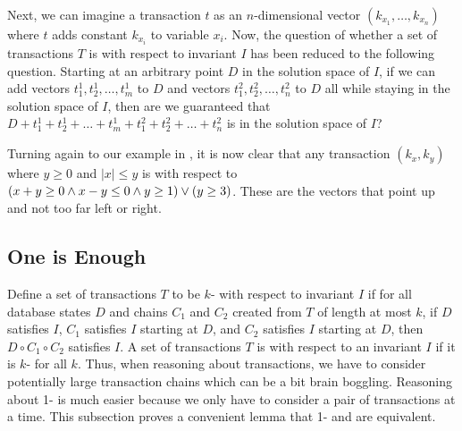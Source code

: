 Next, we can imagine a transaction $t$ as an $n$-dimensional vector $(k_{x_1},
\ldots, k_{x_n})$ where $t$ adds constant $k_{x_i}$ to variable $x_i$. Now, the
question of whether a set of transactions $T$ is \iconfluent{} with respect to
invariant $I$ has been reduced to the following question. Starting at an
arbitrary point $D$ in the solution space of $I$, if we can add vectors $t^1_1,
t^1_2, \ldots, t^1_m$ to $D$ and vectors $t^2_1, t^2_2, \ldots, t^2_n$ to $D$
all while staying in the solution space of $I$, then are we guaranteed that $D
+ t^1_1 + t^1_2 + \ldots + t^1_m + t^2_1 + t^2_2 + \ldots + t^2_n$ is in the
solution space of $I$?

Turning again to our example in , it is now clear
that any transaction $(k_x, k_y)$ where $y \geq 0$ and $|x| \leq y$ is
\iconfluent{} with respect to $(x + y \geq 0 \land x - y \leq 0 \land y \geq 1) \lor (y \geq 3)$. These are the vectors that point up and
not too far left or right.

\subsection{One is Enough}\label{sec:counter-one}
Define a set of transactions $T$ to be $k$-\iconfluent{} with respect to
invariant $I$ if for all database states $D$ and chains $C_1$ and $C_2$ created
from $T$ of length at most $k$, if $D$ satisfies $I$, $C_1$ satisfies $I$
starting at $D$, and $C_2$ satisfies $I$ starting at $D$, then $D \circ
C_1 \circ C_2$ satisfies $I$.
%
A set of transactions $T$ is \iconfluent{} with respect to an invariant $I$ if
it is $k$-\iconfluent{} for all $k$. Thus, when reasoning about \iconfluent{}
transactions, we have to consider potentially large transaction chains which
can be a bit brain boggling. Reasoning about 1-\iconfluence{} is much easier
because we only have to consider a pair of transactions at a time. This
subsection proves a convenient lemma that 1-\iconfluence{} and \iconfluence{}
are equivalent.

